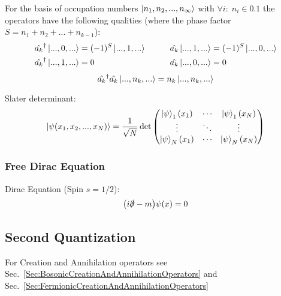 			\noindent
			For the basis of occupation numbers $\Ket{n_1, n_2, ..., n_\infty}$ with $\forall i:\;n_i\in \qty{0,1}$ the operators have the following qualities (where the phase factor $S = n_1 + n_2 + ... + n_{k-1}$):
			\begin{equation}
				\begin{aligned}
					\hat{a_k}^\dagger \Ket{...,0,...} &= (-1)^S \Ket{...,1,...}
					&\hspace{20pt}
					\hat{a_k} \Ket{...,1,...} &= (-1)^S \Ket{...,0,...}
					\\
					\hat{a_k}^\dagger \Ket{...,1,...} &= 0
					&\hspace{20pt}
					\hat{a_k} \Ket{...,0,...} &= 0
				\end{aligned}
			\end{equation}
			\begin{equation}
				\hat{a_k}^\dagger \hat{a_k} \Ket{...,n_k,...} = n_k \Ket{...,n_k,...}
			\end{equation}

			\noindent
			Slater determinant:
			\begin{equation}
				\Ket{\psi(x_1,x_2,...,x_N)} = \frac{1}{\sqrt{N}} \det\left( \begin{matrix}
					\Ket{\psi}_1(x_1) & \dotsb & \Ket{\psi}_1(x_N) \\
					\vdots & \ddots & \vdots \\
					\Ket{\psi}_N(x_1) & \dotsb & \Ket{\psi}_N(x_N) \\
				\end{matrix} \right)
			\end{equation}



		\subsubsection{Free Dirac Equation}
			\noindent
			Dirac Equation (Spin $s=1/2$):
			\begin{equation}
				\qty( i\slashed{\partial} - m ) \psi\qty(x) = 0
			\end{equation}

	\subsection{Second Quantization}
		For Creation and Annihilation operators see Sec.~\ref{Sec:BosonicCreationAndAnnihilationOperators} and Sec.~\ref{Sec:FermionicCreationAndAnnihilationOperators}

